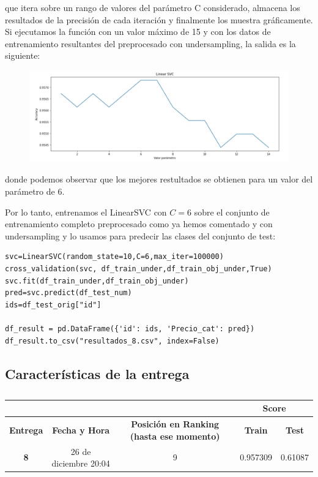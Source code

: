 \documentclass[a4paper,11pt]{article}
\begin{document}
que itera sobre un rango de valores del parámetro C considerado, almacena los resultados de la precisión de cada iteración y finalmente los muestra gráficamente. Si ejecutamos la función con un valor máximo de 15 y con los datos de entrenamiento resultantes del preprocesado con undersampling, la salida es la siguiente: 

\begin{figure}[H]
	\centering
	\includegraphics[width=0.9\linewidth]{img/svc1}
	\caption{}
	\label{fig:svc1}
\end{figure}

donde podemos observar que los mejores restultados se obtienen para un valor del parámetro de 6. 

Por lo tanto, entrenamos el LinearSVC con $C=6$ sobre el conjunto de entrenamiento completo preprocesado como ya hemos comentado y con undersampling y lo usamos para predecir las clases del conjunto de test:

\begin{verbatim}
svc=LinearSVC(random_state=10,C=6,max_iter=100000)
cross_validation(svc, df_train_under,df_train_obj_under,True)
svc.fit(df_train_under,df_train_obj_under)
pred=svc.predict(df_test_num)
ids=df_test_orig["id"]

df_result = pd.DataFrame({'id': ids, 'Precio_cat': pred})
df_result.to_csv("resultados_8.csv", index=False)
\end{verbatim}
\newpage
\subsection{Características de la entrega}
\begin{table}[htbp]
	\caption{}\begin{center}
	\begin{tabular}{|c|c|c|c|c|}
		\hline
		\multicolumn{1}{|l|}{\textbf{}} & \textbf{} & \textbf{} & \multicolumn{ 2}{c|}{\textbf{Score}} \\ \hline
		\textbf{Entrega} & \textbf{Fecha y Hora} & \textbf{Posición en Ranking (hasta ese momento)} & \textbf{Train} & \textbf{Test} \\ \hline
		\textbf{8} & 26 de diciembre 20:04 & 9 & \multicolumn{1}{r|}{0.957309} & 0.61087 \\ \hline
	\end{tabular}\end{center}
	\label{}
\end{table}
\end{document}
